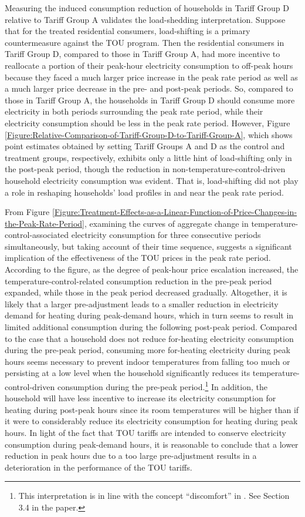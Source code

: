 Measuring the induced consumption reduction of households in Tariff Group D relative to Tariff Group A validates the load-shedding interpretation. Suppose that for the treated residential consumers, load-shifting is a primary countermeasure against the TOU program. Then the residential consumers in Tariff Group D, compared to those in Tariff Group A, had more incentive to reallocate a portion of their peak-hour electricity consumption to off-peak hours because they faced a much larger price increase in the peak rate period as well as a much larger price decrease in the pre- and post-peak periods. So, compared to those in Tariff Group A, the households in Tariff Group D should consume more electricity in both periods surrounding the peak rate period, while their electricity consumption should be less in the peak rate period. However, Figure \ref{Figure:Relative-Comparison-of-Tariff-Group-D-to-Tariff-Group-A}, which shows point estimates obtained by setting Tariff Groups A and D as the control and treatment groups, respectively, exhibits only a little hint of load-shifting only in the post-peak period, though the reduction in non-temperature-control-driven household electricity consumption was evident. That is, load-shifting did not play a role in reshaping households' load profiles in and near the peak rate period. 

From Figure \ref{Figure:Treatment-Effects-as-a-Linear-Function-of-Price-Changes-in-the-Peak-Rate-Period}, examining the curves of aggregate change in temperature-control-associated electricity consumption for three consecutive periods simultaneously, but taking account of their time sequence, suggests a significant implication of the effectiveness of the TOU prices in the peak rate period. According to the figure, as the degree of peak-hour price escalation increased, the temperature-control-related consumption reduction in the pre-peak period expanded, while those in the peak period decreased gradually. Altogether, it is likely that a larger pre-adjustment leads to a smaller reduction in electricity demand for heating during peak-demand hours, which in turn seems to result in limited additional consumption during the following post-peak period. Compared to the case that a household does not reduce for-heating electricity consumption during the pre-peak period, consuming more for-heating electricity during peak hours seems necessary to prevent indoor temperatures from falling too much or persisting at a low level when the household significantly reduces its temperature-control-driven consumption during the pre-peak period.\footnote{This interpretation is in line with the concept ``discomfort'' in \cite{Smart-Thermoststs-Automation-and-Time-Varying-Prices_Blonz-et-al_2021}. See Section 3.4 in the paper.} In addition, the household will have less incentive to increase its electricity consumption for heating during post-peak hours since its room temperatures will be higher than if it were to considerably reduce its electricity consumption for heating during peak hours. In light of the fact that TOU tariffs are intended to conserve electricity consumption during peak-demand hours, it is reasonable to conclude that a lower reduction in peak hours due to a too large pre-adjustment results in a deterioration in the performance of the TOU tariffs. 
